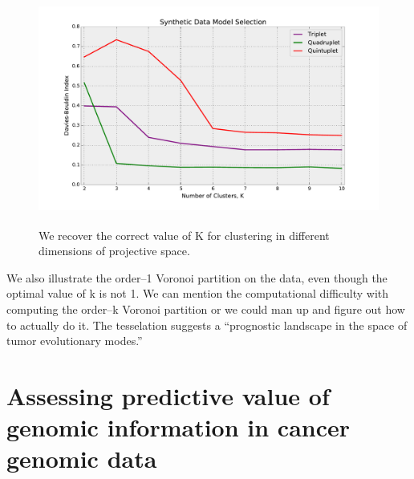 \documentclass[a4paper,11pt]{article}
\begin{document}
\begin{figure}[t!]
    \centering
    \includegraphics[height=3in]{figures/synthetic_davies_bouldin.pdf}
    \caption{We recover the correct value of K for clustering in different dimensions of projective space.}
    \label{fig:davies_bouldin}
\end{figure}


We also illustrate the order--1 Voronoi partition on the data, even though the optimal value of k is not 1.
We can mention the computational difficulty with computing the order--k Voronoi partition or we could man up and figure out how to actually do it.
The tesselation suggests a ``prognostic landscape in the space of tumor evolutionary modes.'' 




\section{Assessing predictive value of genomic information in cancer genomic data}\label{sec:cancer}
\end{document}
